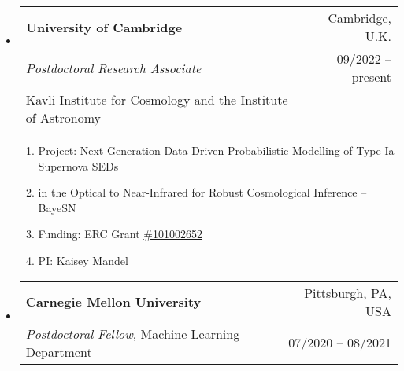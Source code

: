 \documentclass[letterpaper,10pt]{article}
\makeatletter
\newcommand{\subheadingtwolines}[4]{
\begin{tabular*}{6.55in}{l@{\cftdotfill{\cftsecdotsep}\extracolsep{\fill}}r}
#1 & #2 \\
#3 & #4 \\
\end{tabular*}}
\newcommand{\subheadingthreelines}[6]{
\begin{tabular*}{6.45in}{l@{\cftdotfill{\cftsecdotsep}\extracolsep{\fill}}r}
#1 & #2 \\
#3 & #4 \\
#5 & #6 \\
\end{tabular*}}
\makeatother
\begin{document}
\begin{itemize}[leftmargin=0.4cm, itemsep=0.5cm]



\item[] \hspace{-2ex}\subheadingthreelines{\bf University of Cambridge}{Cambridge, U.K.}{{\it Postdoctoral Research Associate}}{09/2022 -- present}{Kavli Institute for Cosmology and the Institute of Astronomy}{}

\begin{enumerate}[leftmargin=0.3cm, itemsep=-0.05ex]
	\item[] Project: Next-Generation Data-Driven Probabilistic Modelling of Type Ia Supernova SEDs 
	\item[] \hspace{9.125ex}in the Optical to Near-Infrared for Robust Cosmological Inference -- BayeSN
	\item[] Funding: ERC Grant \href{https://www.ast.cam.ac.uk/content/dr.kaisey.mandel.awarded.erc.consolidator.grant}{\#101002652}
	\item[] PI: Kaisey Mandel
\end{enumerate}

\item[] \hspace{-2ex}\subheadingtwolines{\bf Carnegie Mellon University}{Pittsburgh, PA, USA}{{\it Postdoctoral Fellow}, Machine Learning Department}{07/2020 -- 08/2021}
\vspace{-0.3cm}


\end{itemize}
\end{document}
